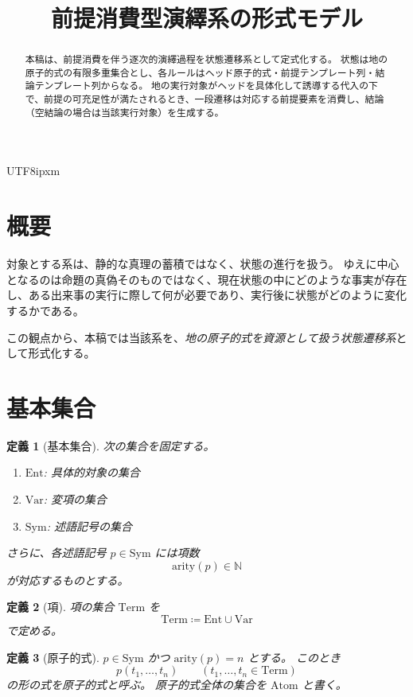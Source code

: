 \documentclass[a4paper,11pt]{bxjsarticle}
\title{前提消費型演繹系の形式モデル}
\author{}
\date{}
\newcommand{\JPCJKfamily}{ipxm}
\newtheorem{definition}{定義}[section]
\newcommand{\Ent}{\mathrm{Ent}}
\newcommand{\Var}{\mathrm{Var}}
\newcommand{\Sym}{\mathrm{Sym}}
\newcommand{\Term}{\mathrm{Term}}
\newcommand{\Atom}{\mathrm{Atom}}
\newcommand{\arity}{\mathrm{arity}}
\begin{document}
\ifPDFTeX
  \begin{CJK}{UTF8}{\JPCJKfamily}
\fi
\maketitle

\begin{abstract}
本稿は、前提消費を伴う逐次的演繹過程を状態遷移系として定式化する。
状態は地の原子的式の有限多重集合とし、各ルールはヘッド原子的式・前提テンプレート列・結論テンプレート列からなる。
地の実行対象がヘッドを具体化して誘導する代入の下で、前提の可充足性が満たされるとき、一段遷移は対応する前提要素を消費し、結論（空結論の場合は当該実行対象）を生成する。
\end{abstract}

\section{概要}

対象とする系は、静的な真理の蓄積ではなく、状態の進行を扱う。
ゆえに中心となるのは命題の真偽そのものではなく、現在状態の中にどのような事実が存在し、ある出来事の実行に際して何が必要であり、実行後に状態がどのように変化するかである。

この観点から、本稿では当該系を、\emph{地の原子的式を資源として扱う状態遷移系}として形式化する。

\section{基本集合}

\begin{definition}[基本集合]
次の集合を固定する。
\begin{enumerate}[label=\arabic*.]
\item $\Ent$: 具体的対象の集合
\item $\Var$: 変項の集合
\item $\Sym$: 述語記号の集合
\end{enumerate}
さらに、各述語記号 $p \in \Sym$ には項数
\[
\arity(p) \in \mathbb{N}
\]
が対応するものとする。
\end{definition}

\begin{definition}[項]
項の集合 $\Term$ を
\[
\Term \coloneqq \Ent \cup \Var
\]
で定める。
\end{definition}

\begin{definition}[原子的式]
$p \in \Sym$ かつ $\arity(p)=n$ とする。
このとき
\[
p(t_1,\dots,t_n)\qquad (t_1,\dots,t_n \in \Term)
\]
の形の式を原子的式と呼ぶ。
原子的式全体の集合を $\Atom$ と書く。
\end{definition}


\end{CJK}
\end{document}
